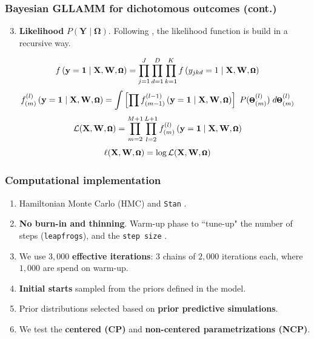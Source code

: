 \documentclass[arial,12pt,xcolor=dvipsnames]{beamer}
\begin{document}
\begin{frame}
	\frametitle{Bayesian GLLAMM for dichotomous outcomes (cont.)}
	\begin{enumerate}
		\setcounter{enumi}{2}
		\item \textbf{Likelihood} $P( \mathbf{Y} \; | \; \pmb{\Omega} )$.
		Following \citet{Rabe_et_al_2004a}, the likelihood function is build in a recursive way. 
	\end{enumerate}
	\vspace{0.3cm} \begin{equation} \label{eq:lik1}
		\footnotesize
		f \left( \mathbf{y}=\mathbf{1} \; | \; \mathbf{X}, \mathbf{W}, \pmb{\Omega} \right) = \prod_{j=1}^{J} \prod_{d=1}^{D} \prod_{k=1}^{K} f \left( y_{jkd}=1 \; | \; \mathbf{X}, \mathbf{W}, \pmb{\Omega} \right)
	\end{equation}
	\begin{equation} \label{eq:lik2}
		\footnotesize
		f^{(l)}_{(m)} \left( \mathbf{y}=\mathbf{1} \; | \; \mathbf{X}, \mathbf{W}, \pmb{\Omega} \right) = \int \left[ \prod f^{(l-1)}_{(m-1)} \left( \mathbf{y}=\mathbf{1} \; | \; \mathbf{X}, \mathbf{W}, \pmb{\Omega} \right) \right] \; P( \pmb{\Theta}^{(l)}_{(m)} ) \; d\pmb{\Theta}^{(l)}_{(m)}
	\end{equation}
	\begin{equation} \label{eq:lik3}
		\footnotesize
		\mathcal{L}(\mathbf{X}, \mathbf{W}, \pmb{\Omega}) = \prod_{m=2}^{M+1} \prod_{l=2}^{L+1} f^{(l)}_{(m)} \left( \mathbf{y}=\mathbf{1} \; | \; \mathbf{X}, \mathbf{W}, \pmb{\Omega} \right)
	\end{equation}
	\begin{equation} \label{eq:loglik}
		\footnotesize
		\ell(\mathbf{X}, \mathbf{W}, \pmb{\Omega}) = \log \mathcal{L}(\mathbf{X}, \mathbf{W}, \pmb{\Omega})
	\end{equation}
\end{frame}
%
\begin{frame}
	\frametitle{Computational implementation}
	\begin{enumerate}
		\item Hamiltonian Monte Carlo (HMC) and \texttt{Stan} \cite{Stan2020}.
		\item \textbf{No burn-in and thinning}. Warm-up phase to ``tune-up" the number of steps (\texttt{leapfrogs}), and the \texttt{step size} \cite{Stan2020}.
		\item We use $3,000$ \textbf{effective iterations}: $3$ chains of $2,000$ iterations each, where $1,000$ are spend on warm-up.
		\item \textbf{Initial starts} sampled from the priors defined in the model.
		\item Prior distributions selected based on \textbf{prior predictive simulations}.
		\item We test the \textbf{centered (CP)} and \textbf{non-centered parametrizations (NCP)}.
	\end{enumerate}
\end{frame}
%
%
%
\end{document}
